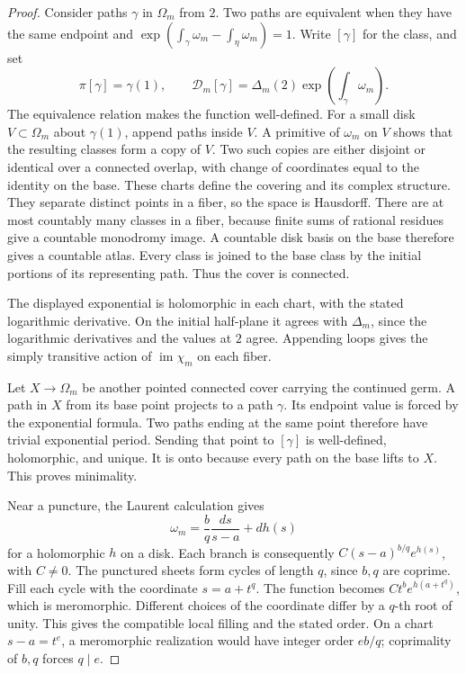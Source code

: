 \begin{proof}
Consider paths \(\gamma\) in \(\Omega_m\) from \(2\).
Two paths are equivalent when they have the same endpoint and
\(\exp(\int_\gamma\omega_m-\int_\eta\omega_m)=1\).
Write \([\gamma]\) for the class, and set
\[
 \pi[\gamma]=\gamma(1),\qquad
 \mathcal D_m[\gamma]=\Delta_m(2)
       \exp\left(\int_\gamma\omega_m\right).
\]
The equivalence relation makes the function well-defined.
For a small disk \(V\subset\Omega_m\) about \(\gamma(1)\), append
paths inside \(V\).  A primitive of \(\omega_m\) on \(V\) shows
that the resulting classes form a copy of \(V\).
Two such copies are either disjoint or identical over a connected overlap,
with change of coordinates equal to the identity on the base.
These charts define the covering and its complex structure.
They separate distinct points in a fiber, so the space is Hausdorff.
There are at most countably many classes in a fiber, because finite sums
of rational residues give a countable monodromy image.
A countable disk basis on the base therefore gives a countable atlas.
Every class is joined to the base class by the initial portions of its
representing path.  Thus the cover is connected.

The displayed exponential is holomorphic in each chart, with the stated
logarithmic derivative.  On the initial half-plane it agrees with
\(\Delta_m\), since the logarithmic derivatives and the values at \(2\)
agree.  Appending loops gives the simply transitive action of
\(\operatorname{im}\chi_m\) on each fiber.

Let \(X\to\Omega_m\) be another pointed connected cover carrying the
continued germ.  A path in \(X\) from its base point projects to a path
\(\gamma\).  Its endpoint value is forced by the exponential formula.
Two paths ending at the same point therefore have trivial exponential
period.  Sending that point to \([\gamma]\) is well-defined, holomorphic,
and unique.  It is onto because every path on the base lifts to \(X\).
This proves minimality.

Near a puncture, the Laurent calculation gives
\[
 \omega_m=\frac bq\frac{ds}{s-a}+dh(s)
\]
for a holomorphic \(h\) on a disk.  Each branch is consequently
\(C(s-a)^{b/q}e^{h(s)}\), with \(C\ne0\).
The punctured sheets form cycles of length \(q\), since \(b,q\) are
coprime.  Fill each cycle with the coordinate \(s=a+t^q\).
The function becomes \(Ct^b e^{h(a+t^q)}\), which is meromorphic.
Different choices of the coordinate differ by a \(q\)-th root of unity.
This gives the compatible local filling and the stated order.
On a chart \(s-a=t^e\), a meromorphic realization would have integer
order \(eb/q\); coprimality of \(b,q\) forces \(q\mid e\).
\end{proof}


